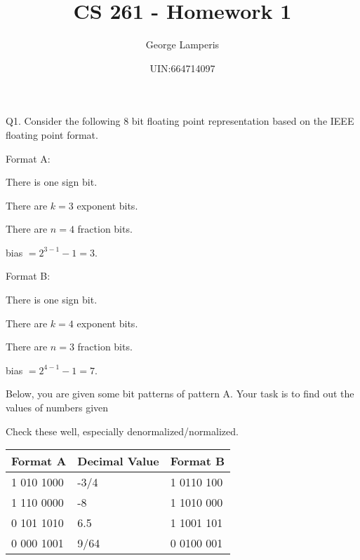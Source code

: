 \documentclass[letterpaper, 11pt]{article}
\title{CS 261 - Homework 1}
\author{George Lamperis}
\date{UIN:664714097}
\theoremstyle{mystyle}
\begin{document}
\maketitle

\section{}
Q1. Consider the following 8 bit floating point representation based on the IEEE floating point
format.

Format A:
\begin{compactitem}
    \item There is one sign bit.
    \item There are $k=3$ exponent bits.
    \item There are $n=4$ fraction bits.
    \item bias $= 2^{3-1}-1 = 3 $.
\end{compactitem}

Format B:
\begin{compactitem}
    \item There is one sign bit.
    \item There are $k=4$ exponent bits.
    \item There are $n=3$ fraction bits.
    \item bias $= 2^{4-1}-1 = 7 $.

\end{compactitem}
Below, you are given some bit patterns of pattern A. Your task is to find out the values of numbers given

Check these well, especially denormalized/normalized.


\begin{tabular}{M|M|M}
    Format A    & Decimal Value     & Format B    \\  010 1000  &  -3/4             & 1 0110 100  \\ 
    1 110 0000  &  -8               & 1 1010 000  \\ 
    0 101 1010  &  6.5              & 1 1001 101  \\
    0 000 1001  &  9/64             & 0 0100 001  \\
\end{tabular}


\end{document}
